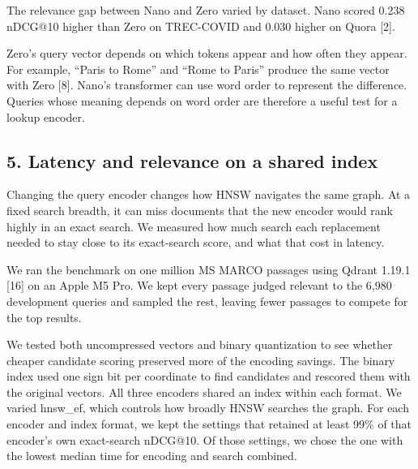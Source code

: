 \documentclass[
  english,
  10pt,
]{article}
\begin{document}
The relevance gap between Nano and Zero varied by dataset. Nano scored
0.238 nDCG@10 higher than Zero on TREC-COVID and 0.030 higher on Quora
{[}2{]}.

Zero's query vector depends on which tokens appear and how often they
appear. For example, ``Paris to Rome'' and ``Rome to Paris'' produce the
same vector with Zero {[}8{]}. Nano's transformer can use word order to
represent the difference. Queries whose meaning depends on word order
are therefore a useful test for a lookup encoder.

\subsection{5. Latency and relevance on a shared
index}\label{latency-and-relevance-on-a-shared-index}

Changing the query encoder changes how HNSW navigates the same graph. At
a fixed search breadth, it can miss documents that the new encoder would
rank highly in an exact search. We measured how much search each
replacement needed to stay close to its exact-search score, and what
that cost in latency.

We ran the benchmark on one million MS MARCO passages using Qdrant
1.19.1 {[}16{]} on an Apple M5 Pro. We kept every passage judged
relevant to the 6,980 development queries and sampled the rest, leaving
fewer passages to compete for the top results.

We tested both uncompressed vectors and binary quantization to see
whether cheaper candidate scoring preserved more of the encoding
savings. The binary index used one sign bit per coordinate to find
candidates and rescored them with the original vectors. All three
encoders shared an index within each format. We varied hnsw\_ef, which
controls how broadly HNSW searches the graph. For each encoder and index
format, we kept the settings that retained at least 99\% of that
encoder's own exact-search nDCG@10. Of those settings, we chose the one
with the lowest median time for encoding and search combined.
\end{document}
